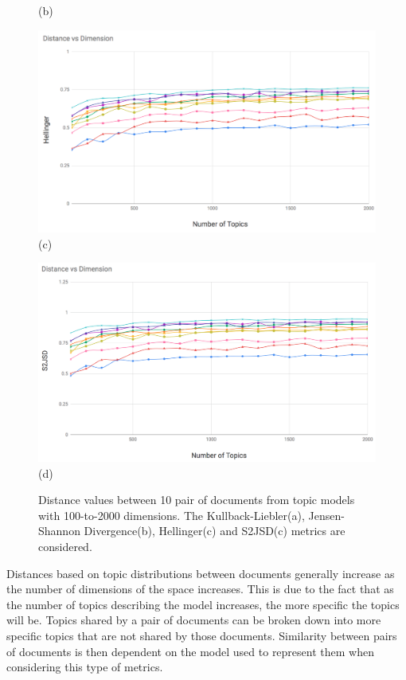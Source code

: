 \begin{figure}
\begin{center}
\begin{adjustbox}{minipage=0.45\linewidth,frame=0pt 3pt}
\centering (b)
\end{adjustbox}
\hfill
\begin{adjustbox}{minipage=0.45\linewidth,frame=0pt 3pt}
\includegraphics[width=\linewidth]{He_100_2k.png}
\centering (c)
\end{adjustbox}
\hfill
\begin{adjustbox}{minipage=0.45\linewidth,frame=0pt 3pt}
\includegraphics[width=\linewidth]{S2JSD_100_2k.png}
\centering (d)
\end{adjustbox}
\end{center}
\caption{Distance values between 10 pair of documents from topic models with 100-to-2000 dimensions. The Kullback-Liebler(a), Jensen-Shannon Divergence(b), Hellinger(c) and S2JSD(c) metrics are considered.}
\label{fig:topic_distances}
\end{figure}

Distances based on topic distributions between documents generally increase as the number of dimensions of the space increases. This is due to the fact that as the number of topics describing the model increases, the more specific the topics will be. Topics shared by a pair of documents can be broken down into more specific topics that are not shared by those documents. Similarity between pairs of documents is then dependent on the model used to represent them when considering this type of metrics. 


